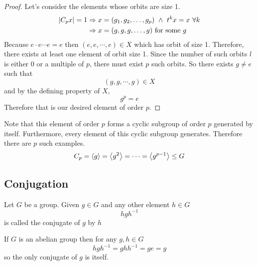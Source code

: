 \documentclass{article}
\begin{document}
\begin{proof}
    Let's consider the elements whose orbits are size 1. 
    \begin{align*}
        \abs{C_px} = 1 &\Rightarrow x = (g_1, g_2, \ldots, g_p) \ \wedge \ t^kx = x \ \forall k\\
        &\Rightarrow x = (g, g, g, \ldots, g) \ \text{for some} \ g
    \end{align*}
    Because $e \cdot e \cdots e = e$ then $(e, e, \cdots, e) \in X$ which has orbit of size 1. Therefore, there exists at least one element of orbit size 1. 
    Since the number of such orbits $l$ is either $0$ or a multiple of $p$, there must exist $p$ such orbits. So there exists $g \neq e$ such that
    \[
        (g, g, \cdots, g) \in X  
    \]
    and by the defining property of $X$,
    \[
        g^p = e  
    \]
    Therefore that is our desired element of order $p$.
\end{proof}

\begin{remark}
    Note that this element of order $p$ forms a cyclic subgroup of order $p$ generated by itself. Furthermore, every element of this cyclic subgroup generates. 
    Therefore there are $p$ such examples.
    \[
        C_p = \left\langle g\right\rangle = \left\langle g^2\right\rangle = \cdots = \left\langle g^{p-1}\right\rangle \leq G 
    \]
\end{remark}

\subsection{Conjugation}
\begin{defi}[conjugate]
    Let $G$ be a group. Given $g \in G$ and any other element $h \in G$
    \[
        hgh^{-1}
    \]
    is called the conjugate of $g$ by $h$
\end{defi}

\begin{ex}
    If $G$ is an abelian group then for any $g, h \in G$
    \[
        hgh^{-1} = ghh^{-1} = ge = g  
    \]
    so the only conjugate of $g$ is itself.
\end{ex}

\end{document}
